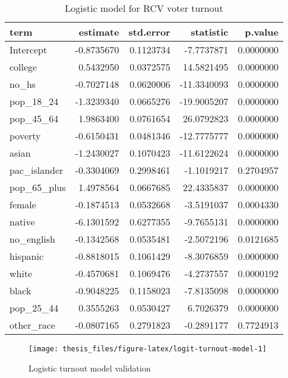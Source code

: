 \documentclass[12pt,twoside]{reedthesis}
\begin{document}
\begin{table}[t]

\caption[Logit turnout model]{\label{tab:logit-turnout-model}Logistic model for RCV voter turnout}
\centering
\begin{tabular}{lrrrr}
\toprule
term & estimate & std.error & statistic & p.value\\
\midrule
Intercept & -0.8735670 & 0.1123734 & -7.7737871 & 0.0000000\\
college & 0.5432950 & 0.0372575 & 14.5821495 & 0.0000000\\
no\_hs & -0.7027148 & 0.0620006 & -11.3340093 & 0.0000000\\
pop\_18\_24 & -1.3239340 & 0.0665276 & -19.9005207 & 0.0000000\\
pop\_45\_64 & 1.9863400 & 0.0761654 & 26.0792823 & 0.0000000\\
\addlinespace
poverty & -0.6150431 & 0.0481346 & -12.7775777 & 0.0000000\\
asian & -1.2430027 & 0.1070423 & -11.6122624 & 0.0000000\\
pac\_islander & -0.3304069 & 0.2998461 & -1.1019217 & 0.2704957\\
pop\_65\_plus & 1.4978564 & 0.0667685 & 22.4335837 & 0.0000000\\
female & -0.1874513 & 0.0532668 & -3.5191037 & 0.0004330\\
\addlinespace
native & -6.1301592 & 0.6277355 & -9.7655131 & 0.0000000\\
no\_english & -0.1342568 & 0.0535481 & -2.5072196 & 0.0121685\\
hispanic & -0.8818015 & 0.1061429 & -8.3076859 & 0.0000000\\
white & -0.4570681 & 0.1069476 & -4.2737557 & 0.0000192\\
black & -0.9048225 & 0.1158023 & -7.8135098 & 0.0000000\\
\addlinespace
pop\_25\_44 & 0.3555263 & 0.0530427 & 6.7026379 & 0.0000000\\
other\_race & -0.0807165 & 0.2791823 & -0.2891177 & 0.7724913\\
\bottomrule
\end{tabular}
\end{table}
\begin{figure}
\texttt{[image: thesis\_files/figure-latex/logit-turnout-model-1]} \caption{Logistic turnout model validation}\label{fig:logit-turnout-model}
\end{figure}
\end{document}
